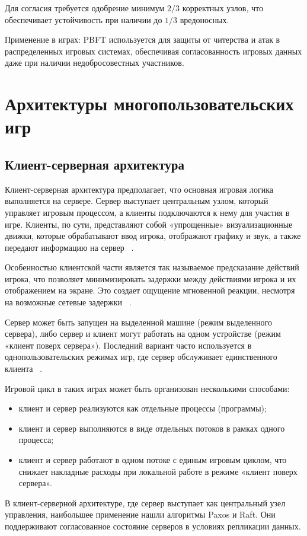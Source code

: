 Для согласия требуется одобрение минимум $2/3$ корректных узлов, что обеспечивает устойчивость при наличии до $1/3$ вредоносных.

Применение в играх: PBFT используется для защиты от читерства и атак в распределенных игровых системах, обеспечивая согласованность игровых данных даже при наличии недобросовестных участников.

\chapter{Архитектуры многопользовательских игр}

\section{Клиент-серверная архитектура}
Клиент-серверная архитектура предполагает, что основная игровая логика выполняется на сервере. Сервер выступает центральным узлом, который управляет игровым процессом, а клиенты подключаются к нему для участия в игре. Клиенты, по сути, представляют собой «упрощенные» визуализационные движки, которые обрабатывают ввод игрока, отображают графику и звук, а также передают информацию на сервер ~\cite{b4}.

Особенностью клиентской части является так называемое предсказание действий игрока, что позволяет минимизировать задержки между действиями игрока и их отображением на экране. Это создает ощущение мгновенной реакции, несмотря на возможные сетевые задержки ~\cite{b4}.

Сервер может быть запущен на выделенной машине (режим выделенного сервера), либо сервер и клиент могут работать на одном устройстве (режим «клиент поверх сервера»). Последний вариант часто используется в однопользовательских режимах игр, где сервер обслуживает единственного клиента ~\cite{b4}.

Игровой цикл в таких играх может быть организован несколькими способами:
\begin{itemize}
	\item клиент и сервер реализуются как отдельные процессы (программы);
	\item клиент и сервер выполняются в виде отдельных потоков в рамках одного процесса;
	\item клиент и сервер работают в одном потоке с единым игровым циклом, что снижает накладные расходы при локальной работе в режиме «клиент поверх сервера».
\end{itemize}

В клиент-серверной архитектуре, где сервер выступает как центральный узел управления, наибольшее применение нашли алгоритмы Paxos и Raft. Они поддерживают согласованное состояние серверов в условиях репликации данных. 

